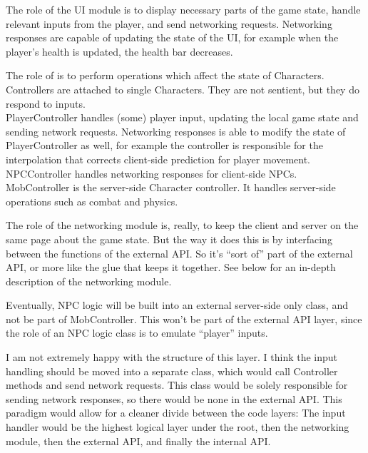 \documentclass{article}
\begin{document}
The role of the UI module is to display necessary parts of the game state, 
handle relevant inputs from the player, and send networking requests. Networking responses
are capable of updating the state of the UI, for example when the player's health is updated,
the health bar decreases.

The role of  is to perform operations which affect the state of
Characters. Controllers are attached to single Characters. They are not sentient, but they
do respond to inputs.\\
PlayerController handles (some) player input, updating the local game state and sending
network requests. Networking responses is able to modify the state of PlayerController as
well, for example the controller is responsible for the interpolation that corrects
client-side prediction for player movement.\\
NPCController handles networking responses for client-side NPCs.\\
MobController is the server-side Character controller. It handles server-side operations such as
combat and physics.

The role of the networking module is, really, to keep the client and server on the same page
about the game state. But the way it does this is by interfacing between the functions of the
external API. So it's ``sort of'' part of the external API, or more like the glue that keeps
it together. See below for an in-depth description of the networking module.

Eventually, NPC logic will be built into an external server-side only class, and not be part
of MobController. This won't be part of the external API layer, since the role of an NPC logic
class is to emulate ``player'' inputs.

I am not extremely happy with the structure of this layer. I think the input handling should be
moved into a separate class, which would call Controller methods and send network requests.
This class would be solely responsible for sending network responses, so there would be none
in the external API. This paradigm would allow for a cleaner divide between the code layers:
The input handler would be the highest logical layer under the root, then the networking module,
then the external API, and finally the internal API.
\end{document}

